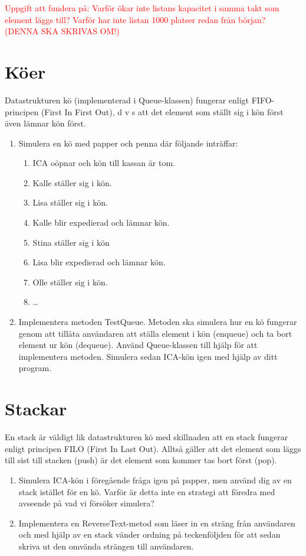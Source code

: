 \documentclass{article}
\begin{document}
  \textcolor{red}{Uppgift att fundera på: Varför ökar inte listans kapacitet i samma takt som element läggs till? Varför har inte listan 1000 platser redan från början? (DENNA SKA SKRIVAS OM!)}

  \section*{Köer}
  Datastrukturen kö (implementerad i Queue-klassen) fungerar enligt FIFO-principen (First
  In First Out), d v s att det element som ställt sig i kön först även lämnar kön först.

  \begin{enumerate}
      \item Simulera en kö med papper och penna där följande inträffar:
	      \begin{enumerate}
	          \item ICA oöpnar och kön till kassan är tom.
	          \item Kalle ställer sig i kön.
	          \item Lisa ställer sig i kön.
	          \item Kalle blir expedierad och lämnar kön.
	          \item Stina ställer sig i kön
	          \item Lisa blir expedierad och lämnar kön.
	          \item Olle ställer sig i kön.
	          \item \ldots
	      \end{enumerate}
      \item Implementera metoden TestQueue. Metoden ska simulera hur en kö fungerar genom
      att tillåta användaren att ställa element i kön (enqueue) och ta bort element ur kön
      (dequeue). Använd Queue-klassen till hjälp för att implementera metoden. Simulera
      sedan ICA-kön igen med hjälp av ditt program.
    \end{enumerate}
  \section*{Stackar}
  En stack är väldigt lik datastrukturen kö med skillnaden att en stack fungerar enligt principen FILO (First In Last Out). Alltså gäller att det element som läggs till sist till stacken (push) är det element som kommer tas bort först (pop).
  \begin{enumerate}
  	          \item Simulera ICA-kön i föregående fråga igen på papper, men använd dig av en stack istället för en kö. Varför är detta inte en strategi att föredra med avseende på vad vi försöker simulera?
  	          \item Implementera en ReverseText-metod som läser in en sträng från användaren och med hjälp av en stack vänder ordning på teckenföljden för att sedan skriva ut den omvända strängen till användaren.	          
   \end{enumerate}
\end{document}
